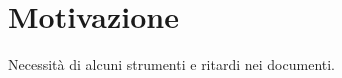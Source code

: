 \documentclass[../Riunione16-01-12.tex]{subfiles}
\begin{document}
\section{Motivazione}
Necessità di alcuni strumenti e ritardi nei documenti.
\end{document}
